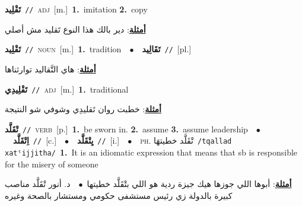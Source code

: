 \documentclass[10pt,a4paper,twoside]{article} %
\begin{document}
\begin{multicols}{2}
{\setlength\topsep{0pt}\textbf{\foreignlanguage{arabic}{تَقْلِيد}}\ {\color{gray}\texttt{//}\color{black}}\ \textsc{adj}\ [m.]\ \textbf{1.}~imitation  \textbf{2.}~copy\  \begin{flushright}\color{gray}\foreignlanguage{arabic}{\textbf{\underline{\foreignlanguage{arabic}{أمثلة}}}: دير بالك هذا النوع تَقليد مش أصلي}\end{flushright}\color{black}} \vspace{2mm}

{\setlength\topsep{0pt}\textbf{\foreignlanguage{arabic}{تَقْلِيد}}\ {\color{gray}\texttt{//}\color{black}}\ \textsc{noun}\ [m.]\ \textbf{1.}~tradition\ \ $\bullet$\ \ \setlength\topsep{0pt}\textbf{\foreignlanguage{arabic}{تَقَالِيد}}\ {\color{gray}\texttt{//}\color{black}}\ [pl.]\  \begin{flushright}\color{gray}\foreignlanguage{arabic}{\textbf{\underline{\foreignlanguage{arabic}{أمثلة}}}: هاي التَّقاليد توارثناها}\end{flushright}\color{black}} \vspace{2mm}

{\setlength\topsep{0pt}\textbf{\foreignlanguage{arabic}{تَقْلِيدِي}}\ {\color{gray}\texttt{//}\color{black}}\ \textsc{adj}\ [m.]\ \textbf{1.}~traditional\  \begin{flushright}\color{gray}\foreignlanguage{arabic}{\textbf{\underline{\foreignlanguage{arabic}{أمثلة}}}: خطبت روان تَقليدِي وشوفي شو النتيجة}\end{flushright}\color{black}} \vspace{2mm}

{\setlength\topsep{0pt}\textbf{\foreignlanguage{arabic}{تْقَلَّد}}\ {\color{gray}\texttt{//}\color{black}}\ \textsc{verb}\ [p.]\ \textbf{1.}~be sworn in.  \textbf{2.}~assume  \textbf{3.}~assume leadership\ \ $\bullet$\ \ \setlength\topsep{0pt}\textbf{\foreignlanguage{arabic}{اِتْقَلَّد}}\ {\color{gray}\texttt{//}\color{black}}\ [c.]\ \ $\bullet$\ \ \setlength\topsep{0pt}\textbf{\foreignlanguage{arabic}{يِتْقَلَّد}}\ {\color{gray}\texttt{//}\color{black}}\ [i.]\ \ $\bullet$\ \ \textsc{ph.} \color{gray} \foreignlanguage{arabic}{تْقَلَّد خطيتهَا}\color{black}\ {\color{gray}\texttt{/{\sffamily tqallad xatˤijjitha}/}\color{black}}\ \textbf{1.}~It is an idiomatic expression that means that sb is responsible for the misery of someone\  \begin{flushright}\color{gray}\foreignlanguage{arabic}{\textbf{\underline{\foreignlanguage{arabic}{أمثلة}}}: أبوها اللي جوزها هيك جيزة ردية هو اللي بتْقَلَّد خطيتها\ $\bullet$\ \  د. أنور تْقَلَّد مناصب كبيرة بالدولة زي رئيس مستشفى حكومي ومستشار بالصحة وغيره}\end{flushright}\color{black}} \vspace{2mm}


\end{multicols}
\end{document}
